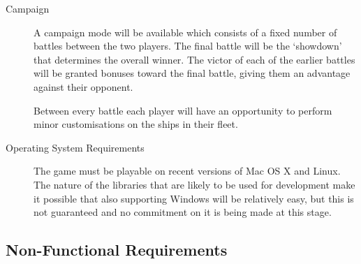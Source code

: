 \begin{description}

	\item[Campaign]

	A campaign mode will be available which consists of a fixed number of battles between the two players.
	The final battle will be the `showdown' that determines the overall winner. The victor of each of
	the earlier battles will be granted bonuses toward the final battle, giving them an advantage against
	their opponent.

	Between every battle each player will have an opportunity to perform minor customisations on
	the ships in their fleet.

	\item[Operating System Requirements]

	The game must be playable on recent versions of Mac OS X and Linux. The nature of the libraries that are likely to be used for development make it possible that also supporting Windows will be relatively easy, but this is not guaranteed and no commitment on it is being made at this stage.


\end{description}

\subsection{Non-Functional Requirements}

